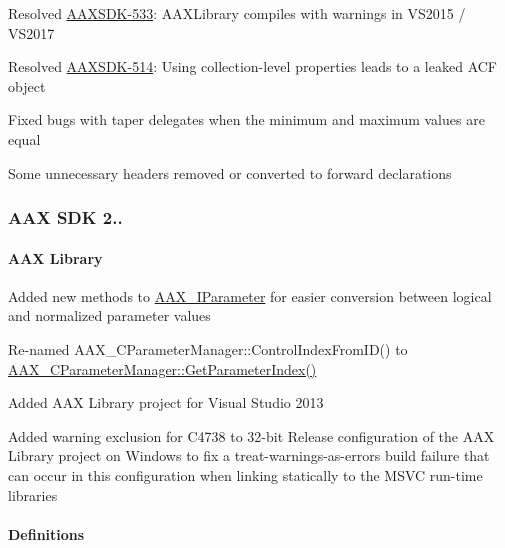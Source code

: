 \begin{DoxyItemize}
\item Resolved \hyperlink{a00374_AAXSDK-533}{A\+A\+X\+S\+D\+K-\/533}\+: A\+A\+X\+Library compiles with warnings in V\+S2015 / V\+S2017  
\item Resolved \hyperlink{a00374_AAXSDK-514}{A\+A\+X\+S\+D\+K-\/514}\+: Using collection-\/level properties leads to a leaked A\+C\+F object  
\item Fixed bugs with taper delegates when the minimum and maximum values are equal  
\item Some unnecessary headers removed or converted to forward declarations  
\end{DoxyItemize}\hypertarget{a00375_aax_sdk_2p2p2}{}\subsubsection{A\+A\+X S\+D\+K 2..}\label{a00375_aax_sdk_2p2p2}
\hypertarget{a00375_aax_sdk_2p2p2_AAXLibrary}{}\paragraph{A\+A\+X Library}\label{a00375_aax_sdk_2p2p2_AAXLibrary}

\begin{DoxyItemize}
\item Added new methods to \hyperlink{a00108}{A\+A\+X\+\_\+\+I\+Parameter} for easier conversion between logical and normalized parameter values 
\item Re-\/named {\ttfamily A\+A\+X\+\_\+\+C\+Parameter\+Manager\+::\+Control\+Index\+From\+I\+D()} to \hyperlink{a00034_ae0f8bc23f8edee29b61de34e3a09b065}{A\+A\+X\+\_\+\+C\+Parameter\+Manager\+::\+Get\+Parameter\+Index()} 
\item Added A\+A\+X Library project for Visual Studio 2013 
\item Added warning exclusion for C4738 to 32-\/bit Release configuration of the A\+A\+X Library project on Windows to fix a treat-\/warnings-\/as-\/errors build failure that can occur in this configuration when linking statically to the M\+S\+V\+C run-\/time libraries 
\end{DoxyItemize}\hypertarget{a00375_aax_sdk_2p2p2_Definitions}{}\paragraph{Definitions}\label{a00375_aax_sdk_2p2p2_Definitions}

